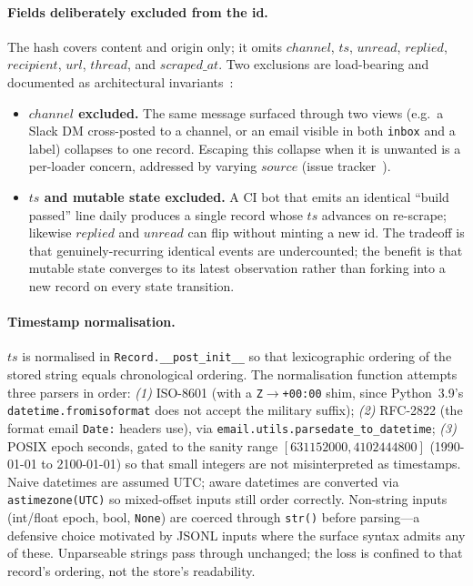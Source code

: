 \paragraph{Fields deliberately excluded from the id.}
The hash covers content and origin only; it omits $\mathit{channel}$,
$\mathit{ts}$, $\mathit{unread}$, $\mathit{replied}$, $\mathit{recipient}$,
$\mathit{url}$, $\mathit{thread}$, and $\mathit{scraped\_at}$. Two exclusions
are load-bearing and documented as
architectural invariants~\cite{TODO-coviber-architecture-md}:
\begin{itemize}
  \item \textbf{$\mathit{channel}$ excluded.} The same message surfaced through
    two views (e.g.\ a Slack DM cross-posted to a channel, or an email visible
    in both \texttt{inbox} and a label) collapses to one record. Escaping
    this collapse when it is unwanted is a per-loader concern, addressed by
    varying $\mathit{source}$ (issue tracker~\cite{TODO-coviber-issue-17}).
  \item \textbf{$\mathit{ts}$ and mutable state excluded.} A CI bot that emits
    an identical ``build passed'' line daily produces a single record whose
    $\mathit{ts}$ advances on re-scrape; likewise $\mathit{replied}$ and
    $\mathit{unread}$ can flip without minting a new id. The tradeoff is that
    genuinely-recurring identical events are undercounted; the benefit is
    that mutable state converges to its latest observation rather than
    forking into a new record on every state transition.
\end{itemize}

\paragraph{Timestamp normalisation.}
$\mathit{ts}$ is normalised in \texttt{Record.\_\_post\_init\_\_} so that
lexicographic ordering of the stored string equals chronological ordering.
The normalisation function attempts three parsers in order:
\emph{(1)} ISO-8601 (with a \texttt{Z}$\rightarrow$\texttt{+00:00} shim, since
Python~3.9's \texttt{datetime.fromisoformat} does not accept the military
suffix); \emph{(2)} RFC-2822 (the format email \texttt{Date:} headers use),
via \texttt{email.utils.parsedate\_to\_datetime}; \emph{(3)} POSIX epoch
seconds, gated to the sanity range $[631152000, 4102444800]$ (1990-01-01 to
2100-01-01) so that small integers are not misinterpreted as timestamps.
Naive datetimes are assumed UTC; aware datetimes are converted via
\texttt{astimezone(UTC)} so mixed-offset inputs still order correctly.
Non-string inputs (int/float epoch, bool, \texttt{None}) are coerced through
\texttt{str()} before parsing---a defensive choice motivated by JSONL inputs
where the surface syntax admits any of these. Unparseable strings pass through
unchanged; the loss is confined to that record's ordering, not the store's
readability.


